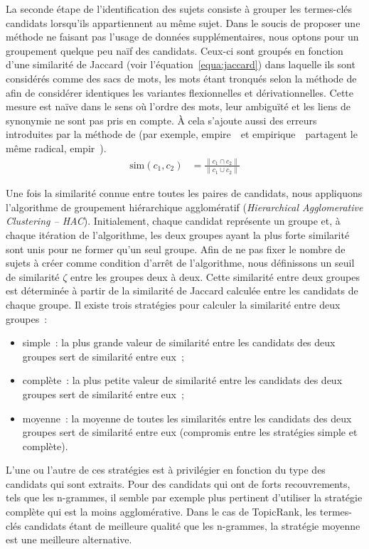     La seconde étape de l'identification des sujets consiste à grouper les
    termes-clés candidats lorsqu'ils appartiennent au même sujet.
    Dans le soucis de proposer une méthode ne faisant pas l'usage de données
    supplémentaires, nous optons pour un groupement quelque peu naïf des
    candidats. Ceux-ci sont groupés en fonction d'une similarité de Jaccard
    (voir l'équation~\ref{equa:jaccard}) dans laquelle ils sont considérés comme
    des sacs de mots, les mots étant tronqués selon la méthode de
     afin de considérer identiques les
    variantes flexionnelles et dérivationnelles. Cette mesure est naïve dans le
    sens où l'ordre des mots, leur ambiguïté et les liens de synonymie ne sont
    pas pris en compte. À cela s'ajoute aussi des erreurs introduites par la
    méthode de  (par exemple,
    \og empire~\fg\ et \og empirique~\fg\ partagent le même radical,
    \og empir~\fg).
    \begin{align}
      \text{sim}(c_1, c_2) &= \frac{\|c_1 \cap c_2\|}{\|c_1 \cup c_2\|} \label{equa:jaccard}
    \end{align}

    Une fois la similarité connue entre toutes les paires de candidats, nous
    appliquons l'algorithme de groupement hiérarchique agglomératif
    (\textit{Hierarchical Agglomerative Clustering -- HAC}). Initialement,
    chaque candidat représente un groupe et, à chaque itération de l'algorithme,
    les deux groupes ayant la plus forte similarité sont unis pour ne former
    qu'un seul groupe. Afin de ne pas fixer le nombre de sujets à créer comme
    condition d'arrêt de l'algorithme, nous définissons un seuil de similarité
    $\zeta$ entre les groupes deux à deux. Cette similarité entre deux groupes
    est déterminée à partir de la similarité de Jaccard calculée entre les
    candidats de chaque groupe. Il existe trois stratégies pour calculer la
    similarité entre deux groupes~:
    \begin{itemize}
      \item{simple~: la plus grande valeur de similarité entre les candidats
            des deux groupes sert de similarité entre eux~;}
      \item{complète~: la plus petite valeur de similarité entre les candidats
            des deux groupes sert de similarité entre eux~;}
      \item{moyenne~: la moyenne de toutes les similarités entre les
            candidats des deux groupes sert de similarité entre eux (compromis
            entre les stratégies simple et complète).}
    \end{itemize}
    L'une ou l'autre de ces stratégies est à privilégier en fonction du type des
    candidats qui sont extraits. Pour des candidats qui ont de forts
    recouvrements, tels que les n-grammes, il semble par exemple plus pertinent
    d'utiliser la stratégie complète qui est la moins agglomérative. Dans le cas
    de TopicRank, les termes-clés candidats étant de meilleure qualité que les
    n-grammes, la stratégie moyenne est une meilleure alternative.

